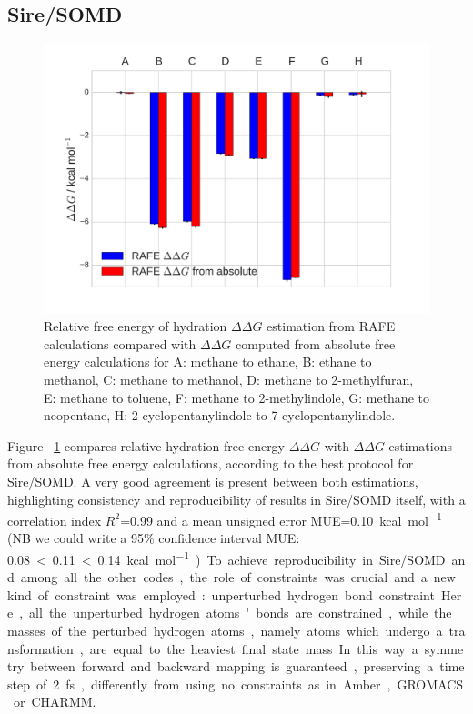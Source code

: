 \documentclass[journal=jctcce,manuscript=article]{achemso}
\begin{document}
\subsection{Sire/SOMD}
\label{sec:somd-results}
\begin{figure}[ht]
  \includegraphics[width=\textwidth]{figures/sire_histogram.pdf}
  \caption{Relative free energy of hydration $\Delta\Delta G$ estimation from RAFE calculations compared with $\Delta\Delta G$ computed from absolute free energy calculations for A: methane to ethane, B: ethane to methanol, C: methane to methanol, D: methane to 2-methylfuran, E: methane to toluene,
  F: methane to 2-methylindole, G: methane to neopentane, H: 2-cyclopentanylindole to 7-cyclopentanylindole.}
  \label{fig:sire_histogram}
\end{figure}


Figure ~\ref{fig:sire_histogram} compares relative hydration free energy $\Delta\Delta G$ with $\Delta\Delta G$ estimations from absolute free energy calculations, according to the best protocol for Sire/SOMD. A very good agreement is present between both estimations, highlighting consistency and reproducibility of results in Sire/SOMD itself, with a correlation index $R^2$=\SI{0.99}{} and a mean unsigned error MUE=\SI{0.10}{kcal.mol^{-1}} 
(NB we could write a 95\% confidence interval MUE: \SI{0.08}< \SI{0.11} < \SI{0.14}{kcal.mol^{-1}})
To achieve reproducibility in Sire/SOMD and among all the other codes, the role of constraints was crucial and a new kind of constraint was employed: unperturbed hydrogen bond constraint. Here, all the unperturbed hydrogen atoms'bonds are constrained, while the masses of the perturbed hydrogen atoms, namely atoms which undergo a transformation, are equal to the heaviest final state mass. In this way a symmetry between forward and backward mapping is guaranteed, preserving a timestep of \SI{2}{fs}, differently from using no constraints as in Amber, GROMACS or CHARMM. 
\end{document}
